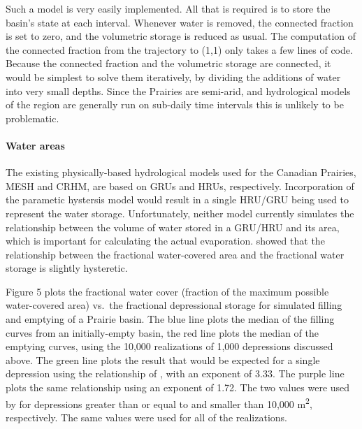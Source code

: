 \documentclass[draft,linenumbers]{agujournal2018}
\begin{document}
Such a model is very easily implemented. All that is required is to
store the basin's state at each interval. Whenever water is removed, the
connected fraction is set to zero, and the volumetric storage is reduced
as usual. The computation of the connected fraction from the trajectory
to (1,1) only takes a few lines of code. Because the connected fraction
and the volumetric storage are connected, it would be simplest to solve
them iteratively, by dividing the additions of water into very small
depths. Since the Prairies are semi-arid, and hydrological models of the
region are generally run on sub-daily time intervals this is unlikely to
be problematic.

\paragraph{Water areas}

The existing physically-based hydrological models used for the Canadian
Prairies, MESH and CRHM, are based on GRUs and HRUs, respectively.
Incorporation of the parametic hystersis model would result in a single
HRU/GRU being used to represent the water storage. Unfortunately,
neither model currently simulates the relationship between the volume of
water stored in a GRU/HRU and its area, which is important for
calculating the actual evaporation.
\citet{shookMemoryEffectsDepressional2011} showed that the relationship
between the fractional water-covered area and the fractional water
storage is slightly hysteretic.

Figure 5 plots the fractional water cover (fraction of the maximum
possible water-covered area) vs.~the fractional depressional storage for
simulated filling and emptying of a Prairie basin. The blue line plots
the median of the filling curves from an initially-empty basin, the red
line plots the median of the emptying curves, using the 10,000
realizations of 1,000 depressions discussed above. The green line plots
the result that would be expected for a single depression using the
relationship of \citet{hayashiSimpleEquationsRepresent2000}, with an
exponent of 3.33. The purple line plots the same relationship using an
exponent of 1.72. The two values were used by
\citet{pomeroyImprovingTestingPrairie2014} for depressions greater than
or equal to and smaller than 10,000 m\textsuperscript{2}, respectively.
The same values were used for all of the realizations.
\end{document}
